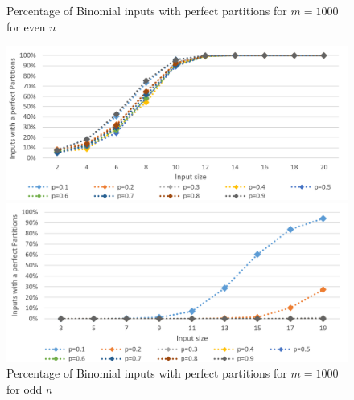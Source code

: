 \begin{figure}[h]
      \centering
      \begin{minipage}[b]{0.45\textwidth}
            \caption{Percentage of Binomial inputs with perfect partitions for $m = 1000$ for even $n$}
            \includegraphics[width=\textwidth]{figures/images/solvabilityOfInputs/binomial_Input_Solvable_m1000_even.png}
      \end{minipage}
      \hspace{0.75cm}
      \begin{minipage}[b]{0.45\textwidth}
            \caption{Percentage of Binomial inputs with perfect partitions for $m = 1000$ for odd $n$}
            \includegraphics[width=\textwidth]{figures/images/solvabilityOfInputs/binomial_Input_Solvable_m1000_uneven.png}
      \end{minipage}
\end{figure}

